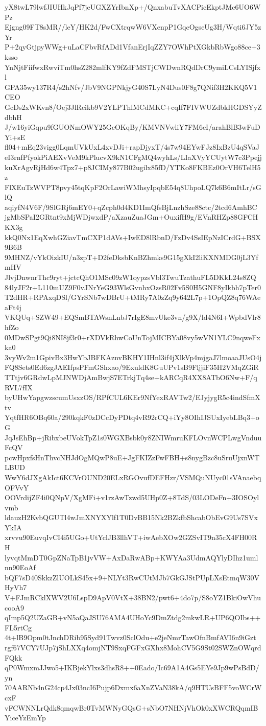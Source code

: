 yX8twL79lwfJIUHkJqPf7jeUGXZYrIbnXp+/QnxabuTvXACPicEkptJMc6UO6WPz
Ejgng09FT8sMR//leY/HK2d/FwCXtrqwW6VXenpP1GqcOgseUg3H/Wqti6JY5zYr
P+2qyGtjpyWWg+uLaCFbvRfADd1VfanErjIqZZY7OWhPtXGkbRbWgo88ce+3ksso
YnNjtFiifwxRwviTm0hsZ282mlfKY9fZdFMSTjCWDwnRQdDrC9ymiLCsLYISjfxl
GPA35wy137R4/s2hNfv/JbV9NGPNkjyG40S7LyN4Dus0F8g7QNif3H2KKQ5V1CEO
GcDs2xWKvn8/Oej3JlRcikb9V2YLPThlMCdMKC+cqIf7FIVWUZdbkHGDSYyZdbhH
J/w16yiGqpu9fGUONmOWY25GcOKqBy/KMVNVwliY7FM6eI/arahBlB3wFuDYi+sE
fl04+mEq23vigg0LqmUVkUxL4xvDJi+rapDjyxT/4s7w94EYwFJz8IxBzU4qSVaJ
eI3rnfPfyokPiAEXvVeM9kPlucvX9kN1CFgMQ4wyhLs/LIaXVyYCUytW7c3Ppejj
kuXrAgvRjHd6w4Tpx7+p8JCIMy877B02ugilx85fD/YTKo8FKBEz0OrVH6TelH5z
FlXEuTzWVPT8pvy45tqKpF2OrLawiWMhsyIpqbE54q8UhpoLQ7k6B6mItLr/sGlQ
aqiyfN4V6F/9SlGRj6mEY0+qZcph0d4KD1ImQfsBjLnzhSze88ctc/2tcd6AmhBC
jgMbSPaI2GRtnt9xMjWDjwxdP/aXzauZuaJGm+OuxifH9g/EVnRHZp88GFCHKX3g
kkQ0Nx1EqXwhGZiavTmCXP1dAVs+IwED8lRbnD/FzDv4SsIEpNzICrdG+BSX9B6B
9MHNZ/vYkOizkIU/n3zpT+D2feDksbKnBZhmks9G15gXkI2liKXNMDG0jL3YfmHV
JlvjDnwnrThc9ryt+jctcQhO1MSc09zW1oypzsVbl3TwuTzathuFL5DKkL24s8ZQ
84lyJF2r+L110mUZ9F0vJNrYeG93WlsGvnhxOzsR02Fv5S0H5GNF8yIkbh7pTer0
T2dHR+RPAxqDSl/GYrSNb7wDBrU+tMRy7A0zZq9y642L7p+1OpQZ8q76WAeaFt4j
VKQUq+SZW49+EQSmBTAWsnLnbJ7rIgE8mvUke3vn/g9X/ld4N6I+WpbdVlr8hfZo
0MDwSPgt9Qi8NI8jf3r0+rXDVkRhwCoUnTojMICBYa08vy5wVN1YLC9nqweFxka0
3vyWv2m1GpivBx3HwYbJBFKAznvBKHY1IHnl3if4jXlkVp4mjgaJ7lmoaaJUsO4j
FQ8Sets0Ed6zgJAEIfpsPFmGShxao/9ExuldK8GuUPv1sB9FljjiF35H2VMqZGiR
TTtjv6GRdwLpMJNWDjAmBwjS7ETrkjTq4se+kARCqR4XX8ATbO6Nw+F/qRVL7fIX
byUHwYapgwzscumUsxzOS/RPfCUL6KEr9NfYexRAVTw2/EJyjygR5c4indSfmXtv
YqtfHR6OBq60a/290kqkF0zDCcDyPDtq4vR92rCQ+iYy8OIhIJSUxIyebLBq3+oG
JqJsEhBp+jRibxbeUVokTpZ1s0WGXBsbk0y8ZNIWmruKFLOvnWCPLwgVnduuFcQV
pcwHpxfsHnThvcNHJdOgMQwP8uE+JgFKIZzFwFBH+s8nygBzc8uSruUjxnWTLBUD
WwY6dJXgAkIct6KCVrOUND20ELxRGOvufDEFHzr/VSMQuNUyc01sVAnaebqOFVvY
OOVrdijZF4i0QNpV/XgMFi+v1rzAwTzwd5UHp0Z+8TdS/03LODeFn+3IOSOylvmb
ldauzH2KvbQGUTl4wJmXNYXYlf1T0DvBB15Nk2BZkfbShcabObEvG9Us7SVxYkIA
xrvvu90EuvqIvCI4i5UGo+UtYclJB3llhVT+iwAebXOw2GZSvIT9n35cX4FH00RH
lyvqtMmDT0GpZNaTpB1jvVW+AxDaRwABp+KWYAa3UdmAQYlyDIhz1umlnn90EoAf
bQF7sD40SkkzZlUOLkS45x+9+NLYt3RwCUtMJb7GkGJStPUpLXsEtmqW30VHyVh7
V+FJmRCklXWV2U6LspD9ApV0VtX+38BN2/pwt6+4do7p/S8oYZ1BkiOwVhucooA9
qImp5Q2UZaGB+vN5aQaJSU76AMA4UHoYc9DmZtdg2mkwLR+UP6QOIbs++FL5rtCg
4t+lB9Opm0tJnchDRib95Syd91Twvz0SclOdu+e2jeNmrTawOfnBmfAVI6n9iGzt
rgf67VCY7UJp7jShLXXq4omjNT9SxqFGFxGXhx8MohCV5G9St02SWZnOWqrdFQkk
qP0WmxmJJwo5+IKBjekYlxs3dhsR8++0Eado/Ic69A1A4Gs5EYe9Jp9wPsBdD/yn
70AARNb4nG24cp4Jx03ncI6Pujp6Dxmx6aXnZVaN38kA/q9HTUsBFF5voWCrWcxF
vFCWNNLrQdk8qmqwBr0TvMWNyGQsG+sNbO7NHNjVhOk0xXWCRQqmIBYiceYzEmYp
